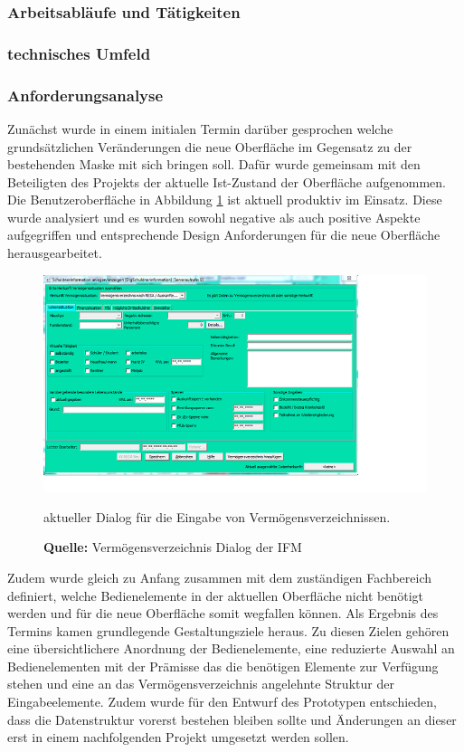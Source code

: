 \subsubsection{Arbeitsabläufe und Tätigkeiten}


\subsubsection{technisches Umfeld}



\subsubsection{Anforderungsanalyse}
Zunächst wurde in einem initialen Termin darüber gesprochen welche grundsätzlichen Veränderungen die neue Oberfläche im Gegensatz zu der bestehenden Maske mit sich bringen soll. Dafür wurde gemeinsam mit den Beteiligten des Projekts der aktuelle Ist-Zustand der Oberfläche aufgenommen. Die Benutzeroberfläche in Abbildung \ref{fig:aktuellerDialog} ist aktuell produktiv im Einsatz. Diese wurde analysiert und es wurden sowohl negative als auch positive Aspekte aufgegriffen und entsprechende Design Anforderungen für die neue Oberfläche herausgearbeitet.
\begin{figure}[H]
  \centering
  \includegraphics[scale=1]{img/aktueller_Dialog.PNG}
  \caption{aktueller Dialog für die Eingabe von Vermögensverzeichnissen.}
  \caption*{\textbf{Quelle:} Vermögensverzeichnis Dialog der IFM}
  \label{fig:aktuellerDialog}
\end{figure}

Zudem wurde gleich zu Anfang zusammen mit dem zuständigen Fachbereich definiert, welche Bedienelemente in der aktuellen Oberfläche nicht benötigt werden und für die neue Oberfläche somit wegfallen können. Als Ergebnis des Termins kamen grundlegende Gestaltungsziele heraus. Zu diesen Zielen gehören eine übersichtlichere Anordnung der Bedienelemente, eine reduzierte Auswahl an Bedienelementen mit der Prämisse das die benötigen Elemente zur Verfügung stehen und eine an das Vermögensverzeichnis angelehnte Struktur der Eingabeelemente. Zudem wurde für den Entwurf des Prototypen entschieden, dass die Datenstruktur vorerst bestehen bleiben sollte und Änderungen an dieser erst in einem nachfolgenden Projekt umgesetzt werden sollen.

